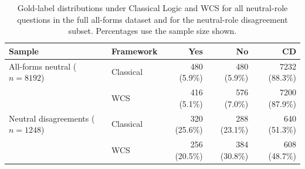 \begin{table}[htbp]
\centering
\small
\setlength{\tabcolsep}{3pt}
\caption{Gold-label distributions under Classical Logic and WCS for all neutral-role questions in the full all-forms dataset and for the neutral-role disagreement subset. Percentages use the sample size shown.}
\label{tab:label-distribution-by-sample-final2}
\begin{tabular}{llrrr}
\toprule
Sample & Framework & Yes & No & CD \\
\midrule
All-forms neutral ($n=8192$) & Classical & 480 (5.9\%) & 480 (5.9\%) & 7232 (88.3\%) \\
 & WCS & 416 (5.1\%) & 576 (7.0\%) & 7200 (87.9\%) \\
Neutral disagreements ($n=1248$) & Classical & 320 (25.6\%) & 288 (23.1\%) & 640 (51.3\%) \\
 & WCS & 256 (20.5\%) & 384 (30.8\%) & 608 (48.7\%) \\
\bottomrule
\end{tabular}
\end{table}
